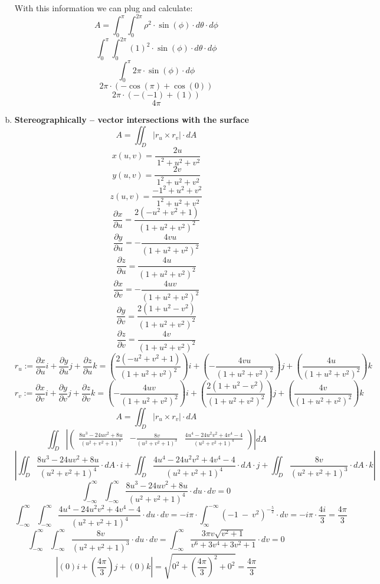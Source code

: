 \documentclass{article}
\begin{document}
\begin{enumerate}[a.]
            With this information we can plug and calculate:
            \[ A =\int_{0}^{\pi}\int_{0}^{2\pi} \rho^2\cdot\sin(\phi)\cdot d\theta\cdot d\phi  \]
            \[ \int_{0}^{\pi}\int_{0}^{2\pi} (1)^2\cdot\sin(\phi)\cdot d\theta\cdot d\phi\]
            \[ \int_{0}^{\pi}2\pi \cdot \sin(\phi)\cdot d\phi \]
            \[ 2\pi \cdot (-\cos(\pi) + \cos(0)) \]
            \[ 2\pi \cdot (-(-1)+(1)) \]
            \[ 4\pi\]

	\item \textbf{Stereographically -- vector intersections with the surface}
	\[ A = \iint_{D} |r_u \times r_v| \cdot dA \]
	\[x(u,v)=\frac{2u}{\:1^2+u^2+v^2}\]
	\[y(u,v)=\frac{2v}{\:1^2+u^2+v^2}\]
	\[z(u,v)=\frac{-1^2+u^2+v^2}{\:1^2+u^2+v^2}\]
	\[\frac{\partial x}{\partial u} = \frac{2\left(-u^2+v^2+1\right)}{\left(1+u^2+v^2\right)^2}\]
	\[\frac{\partial y}{\partial u} = -\frac{4vu}{\left(1+u^2+v^2\right)^2}\]
	\[\frac{\partial z}{\partial u} = \frac{4u}{\left(1+u^2+v^2\right)^2}\]
	\[\frac{\partial x}{\partial v} = -\frac{4uv}{\left(1+u^2+v^2\right)^2}\]
	\[\frac{\partial y}{\partial v} = \frac{2\left(1+u^2-v^2\right)}{\left(1+u^2+v^2\right)^2}\]
	\[\frac{\partial z}{\partial v} = \frac{4v}{\left(1+u^2+v^2\right)^2}\]
	\[r_u := \frac{\partial x}{\partial u}i + \frac{\partial y}{\partial u}j + \frac{\partial z}{\partial u}k = \left(\frac{2\left(-u^2+v^2+1\right)}{\left(1+u^2+v^2\right)^2}\right)i + \left(-\frac{4vu}{\left(1+u^2+v^2\right)^2}\right)j + \left(\frac{4u}{\left(1+u^2+v^2\right)^2}\right)k\]
	\[r_v := \frac{\partial x}{\partial v}i + \frac{\partial y}{\partial v}j + \frac{\partial z}{\partial v}k = \left(-\frac{4uv}{\left(1+u^2+v^2\right)^2}\right)i + \left(\frac{2\left(1+u^2-v^2\right)}{\left(1+u^2+v^2\right)^2}\right)j + \left(\frac{4v}{\left(1+u^2+v^2\right)^2}\right)k\]
	\[ A = \iint_{D} |r_u \times r_v| \cdot dA \]
	\[\iint_{D} \left|\begin{pmatrix}\frac{8u^3-24uv^2+8u}{\left(u^2+v^2+1\right)^4}&-\frac{8v}{\left(u^2+v^2+1\right)^3}&\frac{4u^4-24u^2v^2+4v^4-4}{\left(u^2+v^2+1\right)^4}\end{pmatrix}\right| dA\]
	\[\left|\iint_{D} \frac{8u^3-24uv^2+8u}{\left(u^2+v^2+1\right)^4} \cdot dA \cdot i + \iint_{D}\frac{4u^4-24u^2v^2+4v^4-4}{\left(u^2+v^2+1\right)^4} \cdot dA \cdot j + \iint_{D}\frac{8v}{\left(u^2+v^2+1\right)^3}\cdot dA \cdot k \right|\]
	\[\int_{-\infty}^{\infty}\int_{-\infty}^{\infty} \frac{8u^3-24uv^2+8u}{\left(u^2+v^2+1\right)^4} \cdot du \cdot dv = 0\]
	\[\int_{-\infty}^{\infty}\int_{-\infty}^{\infty}\frac{4u^4-24u^2v^2+4v^4-4}{\left(u^2+v^2+1\right)^4} \cdot  du \cdot dv = -i\pi\cdot\int_{\infty}^{-\infty}\left(-1\:-\:v^2\right)^{-\frac{5}{2}}\cdot dv = -i\pi \cdot \frac{4i}{3} = \frac{4\pi}{3}\]
	\[\int_{-\infty}^{\infty}\int_{-\infty}^{\infty}\frac{8v}{\left(u^2+v^2+1\right)^3} \cdot  du \cdot dv = \int_{-\infty}^{\infty}\frac{3\pi v\sqrt{v^2+1}}{v^6+3v^4+3v^2+1} \cdot dv = 0\]
	\[\left|(0)i + \left(\frac{4\pi}{3}\right)j+(0)k\right|=\sqrt{0^2+\left(\frac{4\pi }{3}\right)^2+0^2}=\frac{4\pi}{3}\]

\end{enumerate}
\end{document}
